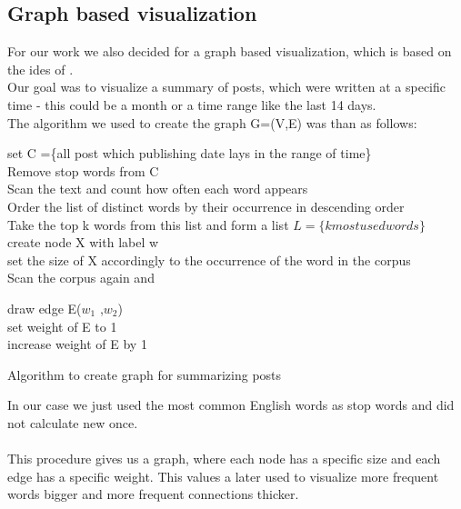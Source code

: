 \subsection{Graph based visualization} \label{sec:graphVisualization}

For our work we also decided for a graph based visualization, which is based on the ides of \cite{visualiuationCorpus3}. \\
Our goal was to visualize a summary of posts, which were written at a specific time - this could be a month or a time range like the last 14 days. \\
The algorithm we used to  create the graph G=(V,E) was than as follows: \\

\begin{algorithm}
	
	set C =\{all post which publishing date lays in the range of time\} \\
	Remove stop words from C \\
	Scan the text and count how often each word appears \\
	Order the list of distinct words by their occurrence in descending order \\
	Take the top k words from this list and form a list $  L = \{ k most used words\}$ \\
	{
		create node X with label w \\
		set the size of X accordingly to the occurrence of the word in the corpus  \\
	}
	Scan the corpus again and \\
	{
		{	
			draw edge E($w_1$ ,$w_2$)\\
			set weight of E to 1 \\
			
		}
		{
			increase weight of E by 1
		}
		
	}
	
	\caption{Algorithm to create graph for summarizing  posts}
\end{algorithm}

In our case we just used the most common English words as stop words and did not calculate new once. \\
~\\

This procedure gives us a graph, where each node has a specific size and each edge has a specific weight. This values a later used to visualize more frequent words bigger and more frequent connections thicker. 







